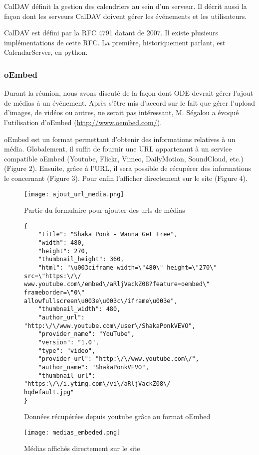 CalDAV définit la gestion des calendriers au sein d'un serveur. Il décrit aussi la façon dont les serveurs CalDAV doivent gérer les événements et les utilisateurs.

CalDAV est défini par la RFC 4791 datant de 2007. Il existe plusieurs implémentations de cette RFC. La première, historiquement parlant, est CalendarServer, en python.

\subsubsection*{oEmbed}

Durant la réunion, nous avons discuté de la façon dont ODE devrait gérer l'ajout de médias à un événement. Après s'être mis d'accord sur le fait que gérer l'upload d'images, de vidéos ou autres, ne serait pas intéressant, M. Ségalou a évoqué l'utilisation d'oEmbed (\url{http://www.oembed.com/}).

oEmbed est un format permettant d'obtenir des informations relatives à un média. Globalement, il suffit de fournir une URL appartenant à un service compatible oEmbed (Youtube, Flickr, Vimeo, DailyMotion, SoundCloud, etc.) (Figure 2). Ensuite, grâce à l'URL, il sera possible de récupérer des informations le concernant (Figure 3). Pour enfin l'afficher directement sur le site (Figure 4).

\newpage

\begin{figure}[H]
\begin{center}
\texttt{[image: ajout\_url\_media.png]}
\end{center}
\caption{Partie du formulaire pour ajouter des urls de médias}
\end{figure}


\begin{figure}[H]
\begin{lstlisting}[frame=single]
{
    "title": "Shaka Ponk - Wanna Get Free", 
    "width": 480, 
    "height": 270, 
    "thumbnail_height": 360, 
    "html": "\u003ciframe width=\"480\" height=\"270\" src=\"https:\/\/
www.youtube.com\/embed\/aRljVackZ08?feature=oembed\" frameborder=\"0\" 
allowfullscreen\u003e\u003c\/iframe\u003e", 
    "thumbnail_width": 480, 
    "author_url": "http:\/\/www.youtube.com\/user\/ShakaPonkVEVO", 
    "provider_name": "YouTube", 
    "version": "1.0", 
    "type": "video", 
    "provider_url": "http:\/\/www.youtube.com\/", 
    "author_name": "ShakaPonkVEVO", 
    "thumbnail_url": "https:\/\/i.ytimg.com\/vi\/aRljVackZ08\/
hqdefault.jpg"
}
\end{lstlisting}
\caption{Données récupérées depuis youtube grâce au format oEmbed}
\end{figure}

\begin{figure}[H]
\begin{center}
\texttt{[image: medias\_embeded.png]}
\end{center}
\caption{Médias affichés directement sur le site}
\end{figure}
